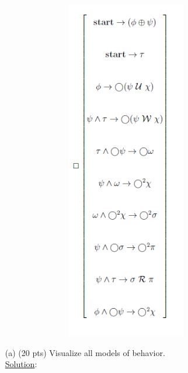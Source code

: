 \documentclass[12pt]{article}
\begin{document}
\begin{enumerate}
\begin{figure}[h!]
\centering
\includegraphics[width=0.9\textwidth, height = 15cm, keepaspectratio]{images/Q6.png}
\end{figure}
\begin{itemize}
\item[(a)](20 pts) Visualize all models of behavior. \\
\noindent \underline{Solution}:\\
\begin{figure}[h!]
\centering

\end{figure}
\end{itemize}
\end{enumerate}
\end{document}
